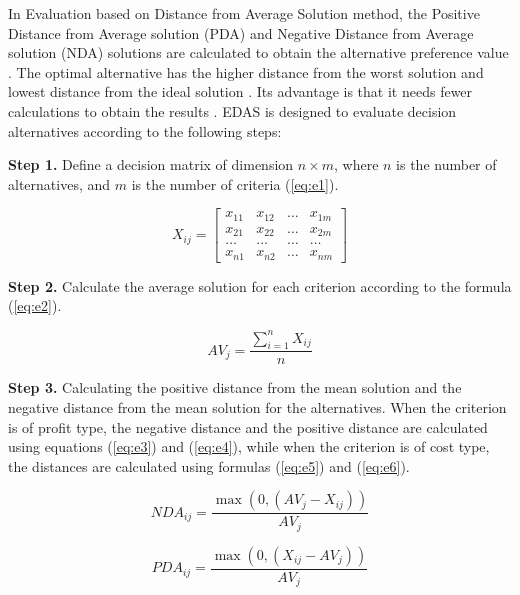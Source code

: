 In Evaluation based on Distance from Average Solution method, the Positive Distance from Average solution (PDA) and Negative Distance from Average solution (NDA) solutions are calculated to obtain the alternative preference value \cite{rashid2021hybrid}. The optimal alternative has the higher distance from the worst solution and lowest distance from the ideal solution \cite{kundakci2019integrated}. Its advantage is that it needs fewer calculations to obtain the results \cite{torkayesh2020entropy}. EDAS is designed to evaluate decision alternatives according to the following steps:

\noindent \textbf{Step 1.} Define a decision matrix of dimension $n \times m$, where $n$ is the number of alternatives, and $m$ is the number of criteria (\ref{eq:e1}).

\begin{equation}
X_{i j}=\left[\begin{array}{llll}
x_{11} & x_{12} & \ldots & x_{1 m} \\
x_{21} & x_{22} & \ldots & x_{2 m} \\
\ldots & \ldots & \ldots & \ldots \\
x_{n 1} & x_{n 2} & \ldots & x_{n m}
\end{array}\right]
\label{eq:e1}
\end{equation}

\noindent \textbf{Step 2.} Calculate the average solution for each criterion according to the formula (\ref{eq:e2}).

\begin{equation}
A V_{j}=\frac{\sum_{i=1}^{n} X_{i j}}{n}
\label{eq:e2}
\end{equation}

\noindent \textbf{Step 3.} Calculating the positive distance from the mean solution and the negative distance from the mean solution for the alternatives. When the criterion is of profit type, the negative distance and the positive distance are calculated using equations (\ref{eq:e3}) and (\ref{eq:e4}), while when the criterion is of cost type, the distances are calculated using formulas (\ref{eq:e5}) and (\ref{eq:e6}).

\begin{equation}
NDA_{i j}=\frac{\max \left(0,\left(A V_{j}-X_{i j}\right)\right)}{A V_{j}}
\label{eq:e3}
\end{equation}

\begin{equation}
PDA_{i j} = \frac{\max \left(0,\left(X_{i j}-A V_{j}\right)\right)}{A V_{j}}
\label{eq:e4}
\end{equation}

